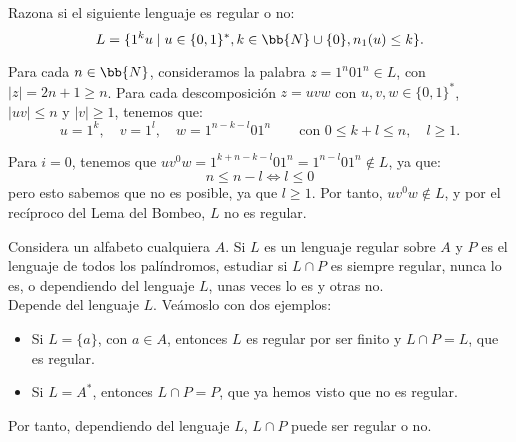 \documentclass[12pt]{article}
\begin{document}
    \begin{ejercicio}
        Razona si el siguiente lenguaje es regular o no:
        \begin{equation*}
            L=\{1^k u\mid u\in \{0,1\}^*, k\in \bb{N}\cup \{0\}, n_1(u)\leq k\}.
        \end{equation*}

        Para cada $n\in \bb{N}$, consideramos la palabra $z=1^{n}01^n\in L$, con $|z|=2n+1\geq n$.
        Para cada descomposición $z=uvw$ con $u,v,w\in \{0,1\}^*$, $|uv|\leq n$ y $|v|\geq 1$, tenemos que:
        \begin{equation*}
            u=1^k,\quad v=1^l,\quad w=1^{n-k-l}01^n\qquad \text{con }0\leq k+l\leq n,\quad l\geq 1.
        \end{equation*}

        Para $i=0$, tenemos que $uv^0w=1^{k+n-k-l}01^n=1^{n-l}01^n\notin L$, ya que:
        \begin{equation*}
            n\leq n-l \Longleftrightarrow l\leq 0
        \end{equation*}
        pero esto sabemos que no es posible, ya que $l\geq 1$. Por tanto, $uv^0w \notin L$, y por el recíproco del Lema del Bombeo, $L$ no es regular.
    \end{ejercicio}

    \begin{ejercicio}
        Considera un alfabeto cualquiera $A$. Si $L$ es un lenguaje regular sobre $A$ y $P$ es el lenguaje de todos los
        palíndromos, estudiar si $L\cap P$ es siempre regular, nunca lo es, o dependiendo del lenguaje $L$, unas veces lo es y otras no.\\

        Depende del lenguaje $L$. Veámoslo con dos ejemplos:
        \begin{itemize}
            \item Si $L=\{a\}$, con $a\in A$, entonces $L$ es regular por ser finito y $L\cap P=L$, que es regular.
            \item Si $L=A^*$, entonces $L\cap P=P$, que ya hemos visto que no es regular.
        \end{itemize}
        Por tanto, dependiendo del lenguaje $L$, $L\cap P$ puede ser regular o no.
    \end{ejercicio}
\end{document}
